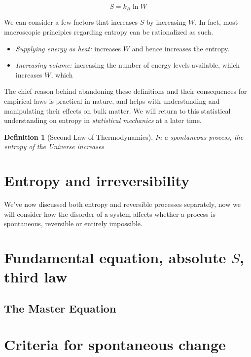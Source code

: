 \documentclass{article}
\numberwithin{theorem}{section}
\numberwithin{corollary}{section}
\numberwithin{postulate}{section}
\numberwithin{lemma}{section}
\newtheorem{definition}{Definition}
\numberwithin{definition}{section}
\begin{document}
\begin{equation}
  S = k_{B} \ln{W}
\end{equation}

We can consider a few factors that increases $S$ by increasing $W$. In fact, most
macroscopic principles regarding entropy can be rationalized as such.

\begin{itemize}
  \item \textit{Supplying energy as heat:} increases $W$ and hence increases the
    entropy.
  \item \textit{Increasing volume:} increasing the number of energy levels
    available, which increases $W$, which
\end{itemize}

The chief reason behind abandoning these definitions and their consequences for
empirical laws is practical in nature, and helps with understanding and
manipulating their effects on bulk matter. We will return to this statistical
understanding on entropy in \textit{statistical mechanics} at a later time.

\begin{definition}[Second Law of Thermodynamics]
  In a spontaneous process, the entropy of the Universe increases
\end{definition}

\section{Entropy and irreversibility}

We've now discussed both entropy and reversible processes separately, now we
will consider how the disorder of a system affects whether a process is
spontaneous, reversible or entirely impossible.

\section{Fundamental equation, absolute $S$, third law}

\subsection{The Master Equation}

\section{Criteria for spontaneous change}
\end{document}
